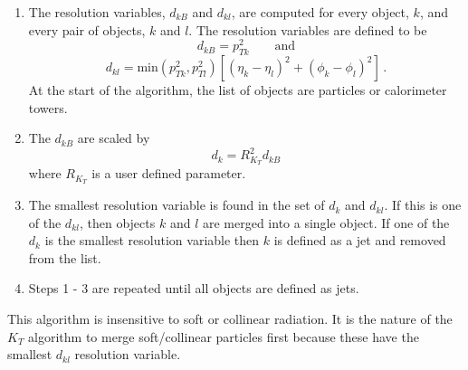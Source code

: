 \begin{enumerate}

\item The resolution variables, $d_{kB}$ and $d_{kl}$, are computed for every object, $k$, and every pair of objects, $k$ and $l$. The resolution variables are defined to be
\begin{equation*}
d_{kB} = p_{Tk}^2 \qquad \text{and}
\end{equation*}
\begin{equation}
d_{kl} = \text{min}\left(p_{Tk}^2, p_{Tl}^2\right)\left[\left(\eta_k - \eta_l\right)^2 + \left(\phi_k - \phi_l\right)^2\right]  \, .
\end{equation}
At the start of the algorithm, the list of objects are particles or calorimeter towers.

\item The $d_{kB}$ are scaled by 
\begin{equation}
d_k = R_{K_T}^2 d_{kB}
\end{equation}
where $R_{K_T}$ is a user defined parameter.

\item The smallest resolution variable is found in the set of $d_k$ and $d_{kl}$. If this is one of the  $d_{kl}$, then objects $k$ and $l$ are merged into a single object. If one of the $d_k$ is the smallest resolution variable then $k$ is defined as a jet and removed from the list.

\item Steps 1 - 3 are repeated until all objects are defined as jets.

\end{enumerate}
This algorithm is insensitive to soft or collinear radiation. It is the nature of the $K_T$ algorithm to merge soft/collinear particles first because these have the smallest $d_{kl}$ resolution variable. 



